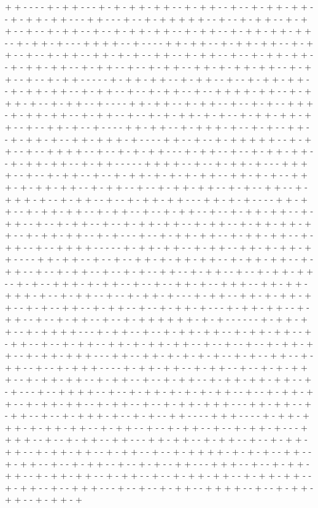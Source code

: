 + + - - - - + - + + - - - + - + - + + - + + - - + - + + - - + - - + - + + - + + - - + - + + - + + - - - + + - - - + - - + - + + + + + - - + - - + - + + - - + - + + - - + - - + - + + - - + - - + - + + - + + - - + - + + - - + - + + - + + - + + - - + - + + - + - - - + + + + - - + - - - - + + - + + - - + - + + - + + - - + - + + - - + - - + - + + - - + + - + - + - - + + - - + - + + - - + - - + - + + - + + - - + - + + - + + - - + - + + - - + - - + - + + - - + + - + - + + - + + - - + - + + - - + - - + - + + - - - - - + - + + - + + - - + - + + - - + - - + - + + - + + - - + - + + - + + - - + - + + - - + - - + - + + - - + - - + + + + - + + - - + - + + + - + - - + - + + - - + - - - - + + - + + - - + - + + - - + - - + - + - - + + + - + - + + - + + - - + - + + - - + - - + - + - + + - + - + - - + - + + - + + - + + - - + - - + + - + - - + - - - - + + - + + - - + - + + + - + - - + - + - - + + - - + - + + - + - - + + - + + + - + - - - - + + - - + - - + - + + + + + - - + - + + - - + - - + + + + - - + - - + - + - + + - - - + - + + - - + - - + - + + - + + - - + - + + - + + - - + - + + - - - - - + + + + - - + - - + - + + - + - - - + + + + - - + - - + - + + - - + - - + - + + - + - + - + - + + - - + + - + - + - - + + + - + - + + - + + - - + - + + - - + - - + - + + - + + - - + - + - - + + - - + - + + + - + - - + - + + - - + - - + - + + - + + - - - + + - + - + - - - - + + - + + - - + - + + - + + - - + - + + - - + - - + - + + - - + - - + - + + - + + - - + - + + - - + - - + - + + - - + - - + - + + - + + - - + - + + - - + - + + - + + - + + - - + - + + - + + - - + - + - - - + - - + - + + - + + - - + - + + - + + - - + - + + - - + - - + + + + - - - - - + - + + - + + - - + - + + - - + + - + - + + - + + - - - - + + - + + - - + - - + - - + + - + - + + - + + - - + - + + - + + - - + - + + - - + - - + - + + - - + - - + - + - - + + - - + - + + - - + - - + - + + - + + - - + - + - - + + + - + - + + - - + - - + - - + + - + - - + + + - - + + - + + - + + + - + - - + - + + - - + - - + - + + - + - - - + - + + - - + + - + - + + - + + - - + - + - - + + - - + - + + - - + - - + - + + - + - - - + - + + - + + - - + - + + - - + - - + - + + - - + - - + - + + + + + + - + - + - - - - - - + - + + - + + - - + - + + + + - - - + - + + - - + - - + - + + - + + - - + - + + - + + - - + - + + - - + - - + - + + - - + + - + - + + - + + - - + - - + - - + - - + - + + - + + - - + - + + - + + + - - - + + - - + + - + - + - + - + - - + - + - - + + - - + - + + - - + - - + - + + + - - - - + - + + - + + - - + - + + - - + - - + - + - + + + - - + - + + - + + - - + - + + - - + - - + - + + - - + - + + - + + - + + - - + - + - - - + - - + + + + - - + - - + - + + - + - + - + - + + - - + - - + - + + - + + - - + - + + - + + - - + - + + - - + - - + - + + - + + + - - - + + - + + - - + - + + - - + - - + - + + + - + - - + - + - - + + - - - - + + + - - - - + - + + - + + + - + - + + - + + - - + - + + - - + - - + - + + - - + - - + - + + - + - - - + + + + - - + - - + - + + - - + + - - - + + - + + - - + - + + - - + - - + - + + - + + - - + - + + - + + - - + - + + - - + - - + - + + + + - + - + - + - - + + - - + - + + - - + - - + - + + - - + - - + - + - - + + - - - + + + - - + - - + - + + - + + - - + - + + - + + - - + - + + - - + - - + - + + - + + - - + - + + - + + - - + - + + - - + - - + + + - - - + - - + - - + - + + - - + + + + - - + - - + - + + - + + - - + - + + - + 